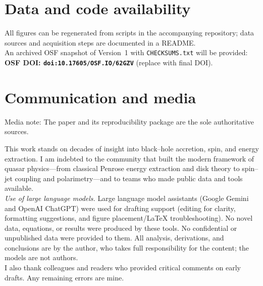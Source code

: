 \documentclass[twocolumn]{aastex701}
\begin{document}
\section*{Data and code availability}
All figures can be regenerated from scripts in the accompanying repository; data sources and acquisition steps are documented in a README.\\
An archived OSF snapshot of Version~1 with \texttt{CHECKSUMS.txt} will be provided: \textbf{OSF DOI: \texttt{doi:10.17605/OSF.IO/62GZV}} (replace with final DOI).
\section*{Communication and media}
Media note: The paper and its reproducibility package are the sole authoritative sources.

\begin{acknowledgments}
This work stands on decades of insight into black–hole accretion, spin, and energy extraction. I am indebted to the community that built the modern framework of quasar physics—from classical Penrose energy extraction and disk theory to spin–jet coupling and polarimetry—and to teams who made public data and tools available.
\\[2pt]
\textit{Use of large language models.} Large language model assistants (Google Gemini and OpenAI ChatGPT) were used for drafting support (editing for clarity, formatting suggestions, and figure placement/LaTeX troubleshooting). No novel data, equations, or results were produced by these tools. No confidential or unpublished data were provided to them. All analysis, derivations, and conclusions are by the author, who takes full responsibility for the content; the models are not authors.
\\[2pt]
I also thank colleagues and readers who provided critical comments on early drafts. Any remaining errors are mine.
\end{acknowledgments}


\nocite{*}


\end{document}
